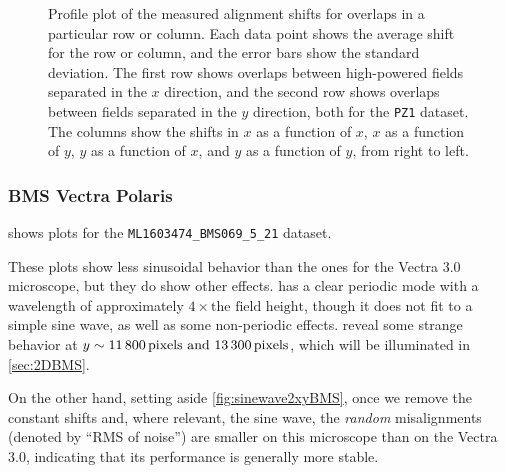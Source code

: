 \documentclass{article}
\begin{document}
\begin{figure}[ht]
\begin{subfigure}{0.24\linewidth}
		\caption{}
		\label{fig:sinewave4yyJHUPolaris}
	\end{subfigure}
	\caption{Profile plot of the measured alignment shifts for overlaps in a particular row or column.  Each data point shows the average shift for the row or column, and the error bars show the standard deviation.  The first row shows overlaps between high-powered fields separated in the $x$ direction, and the second row shows overlaps between fields separated in the $y$ direction, both for the \texttt{PZ1} dataset.  The columns show the shifts in $x$ as a function of $x$, $x$ as a function of $y$, $y$ as a function of $x$, and $y$ as a function of $y$, from right to left.}
	\label{fig:sinewavesJHUPolaris}
\end{figure}

\subsubsection{BMS Vectra Polaris}
\label{sec:BMSperiodic}

 shows plots for the \texttt{ML1603474\_BMS069\_5\_21} dataset.

These plots show less sinusoidal behavior than the ones for the Vectra 3.0 microscope, but they do show other effects.   has a clear periodic mode with a wavelength of approximately $4\times\text{the field height}$, though it does not fit to a simple sine wave, as well as some non-periodic effects.   reveal some strange behavior at $y\sim\text{\SIlist{11800;13300}{pixels}}$, which will be illuminated in \cref{sec:2DBMS}.

On the other hand, setting aside \cref{fig:sinewave2xyBMS}, once we remove the constant shifts and, where relevant, the sine wave, the \emph{random} misalignments (denoted by ``RMS of noise'') are smaller on this microscope than on the Vectra 3.0, indicating that its performance is generally more stable.
\end{document}
